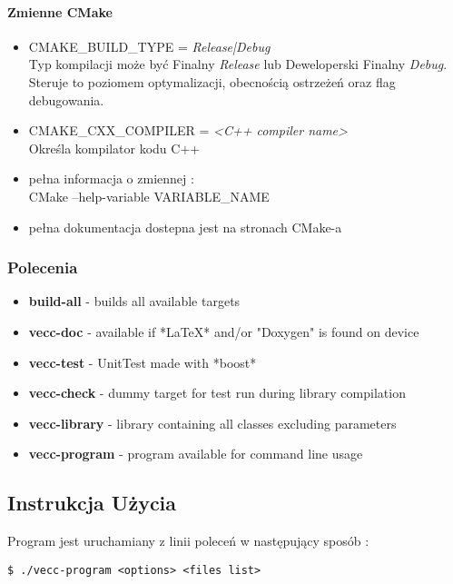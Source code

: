 \documentclass[11pt]{article} %
\begin{document}
\paragraph{Zmienne CMake}
\begin{itemize}
    \item CMAKE\_BUILD\_TYPE = \textsl{Release|Debug} \\
    Typ kompilacji może być Finalny \textsl{Release} lub Deweloperski Finalny \textsl{Debug}. Steruje to poziomem optymalizacji, obecnością ostrzeżeń oraz flag debugowania.

    \item CMAKE\_CXX\_COMPILER = \textsl{<C++ compiler name>} \\
Określa kompilator kodu C++
    \item pełna informacja o zmiennej : \\
CMake --help-variable VARIABLE\_NAME
    \item pełna dokumentacja dostepna jest na stronach CMake-a
\end{itemize}
\subsubsection{Polecenia}

\begin{itemize}

\item \textbf{build-all} - builds all available targets
\item \textbf{vecc-doc} - available if *LaTeX*  and/or "Doxygen" is found on device
\item \textbf{vecc-test} - UnitTest made with *boost*
\item \textbf{vecc-check} - dummy target for test run during library compilation
\item \textbf{vecc-library} - library containing all classes excluding parameters
\item \textbf{vecc-program} - program available for command line usage

\end{itemize}
\subsection{Instrukcja Użycia}
Program jest uruchamiany z linii poleceń w następujący sposób :
\begin{verbatim}
$ ./vecc-program <options> <files list>
\end{verbatim}
\end{document}
